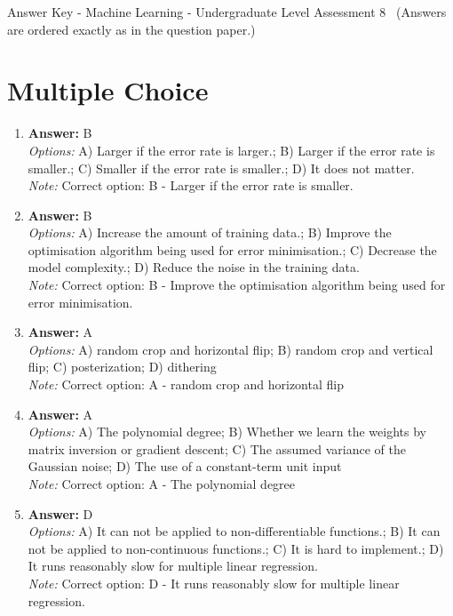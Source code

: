 \documentclass[12pt]{article}
\begin{document}
\begin{center}
Answer Key - Machine Learning - Undergraduate Level Assessment 8 \
\small (Answers are ordered exactly as in the question paper.)
\end{center}

\section*{Multiple Choice}
\begin{enumerate}[label=\arabic*.]
\item \textbf{Answer:} B
\\ \textit{Options:} A) Larger if the error rate is larger.; B) Larger if the error rate is smaller.; C) Smaller if the error rate is smaller.; D) It does not matter.
\\ \textit{Note:} Correct option: B - Larger if the error rate is smaller.
\item \textbf{Answer:} B
\\ \textit{Options:} A) Increase the amount of training data.; B) Improve the optimisation algorithm being used for error minimisation.; C) Decrease the model complexity.; D) Reduce the noise in the training data.
\\ \textit{Note:} Correct option: B - Improve the optimisation algorithm being used for error minimisation.
\item \textbf{Answer:} A
\\ \textit{Options:} A) random crop and horizontal flip; B) random crop and vertical flip; C) posterization; D) dithering
\\ \textit{Note:} Correct option: A - random crop and horizontal flip
\item \textbf{Answer:} A
\\ \textit{Options:} A) The polynomial degree; B) Whether we learn the weights by matrix inversion or gradient descent; C) The assumed variance of the Gaussian noise; D) The use of a constant-term unit input
\\ \textit{Note:} Correct option: A - The polynomial degree
\item \textbf{Answer:} D
\\ \textit{Options:} A) It can not be applied to non-differentiable functions.; B) It can not be applied to non-continuous functions.; C) It is hard to implement.; D) It runs reasonably slow for multiple linear regression.
\\ \textit{Note:} Correct option: D - It runs reasonably slow for multiple linear regression.
\end{enumerate}
\end{document}

